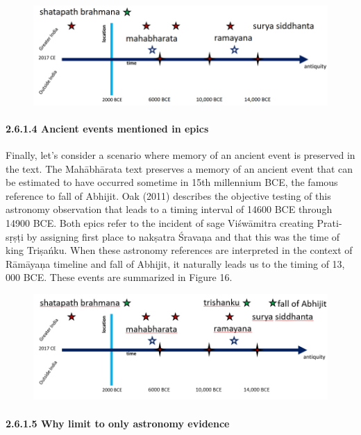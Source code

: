 \begin{figure}[!htbp]
\includegraphics[scale=0.3]{images/8-15.jpg}
\caption{}\label{art8-fig15}
\end{figure}


\paragraph*{2.6.1.4 Ancient events mentioned in epics}

Finally, let’s consider a scenario where memory of an ancient event is preserved in the text. The Mahābhārata text preserves a memory of an ancient event that can be estimated to have occurred sometime in 15th millennium BCE, the famous reference to fall of Abhijit. Oak (2011) describes the objective testing of this astronomy observation that leads to a timing interval of 14600 BCE through 14900 BCE. Both epics refer to the incident of sage Viśwāmitra creating Prati-sṛṣṭi by assigning first place to nakṣatra Śravaņa and that this was the time of king Triṣańku. When these astronomy references are interpreted in the context of Rāmāyaņa timeline and fall of Abhijit, it naturally leads us to the timing of 13, 000 BCE. These events are summarized in Figure 16.

\begin{figure}[!htbp]
\includegraphics[scale=0.3]{images/8-16.jpg}
\caption{}\label{art8-fig16}
\end{figure}


\paragraph*{2.6.1.5 Why limit to only astronomy evidence}

